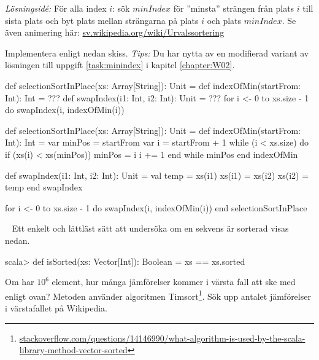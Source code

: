 \emph{Lösningsidé:} För alla index $i$: sök $minIndex$ för ''minsta'' strängen från plats $i$ till sista plats och byt plats mellan strängarna på plats $i$ och plats $minIndex$. Se även animering här: \href{https://sv.wikipedia.org/wiki/Urvalssortering}{sv.wikipedia.org/wiki/Urvalssortering}

Implementera enligt nedan skiss.  \emph{Tips:} Du har nytta av en modifierad variant av lösningen till uppgift \ref{task:minindex} i kapitel \ref{chapter:W02}.
\begin{Code}
def selectionSortInPlace(xs: Array[String]): Unit = 
  def indexOfMin(startFrom: Int): Int = ???
  def swapIndex(i1: Int, i2: Int): Unit = ???
  for i <- 0 to xs.size - 1 do swapIndex(i, indexOfMin(i))
\end{Code}




\SOLUTION


\TaskSolved \what


\begin{Code}
def selectionSortInPlace(xs: Array[String]): Unit = 
  def indexOfMin(startFrom: Int): Int = 
    var minPos = startFrom
    var i = startFrom + 1
    while (i < xs.size) do
      if (xs(i) < xs(minPos)) minPos = i
      i += 1
    end while
    minPos
  end indexOfMin

  def swapIndex(i1: Int, i2: Int): Unit = 
    val temp = xs(i1)
    xs(i1) = xs(i2)
    xs(i2) = temp
  end swapIndex  

  for i <- 0 to xs.size - 1 do swapIndex(i, indexOfMin(i))
end selectionSortInPlace
\end{Code}


\QUESTEND


\clearpage






\QUESTBEGIN

\Task \label{task:isSorted} \what~   Ett enkelt och lättläst sätt att undersöka om en sekvens är sorterad visas nedan.
\begin{REPL}
scala> def isSorted(xs: Vector[Int]): Boolean = xs == xs.sorted
\end{REPL}


\Subtask\Pen  Om  har $10^6$ element, hur många jämförelser kommer i värsta fall att ske med  enligt ovan? Metoden  använder algoritmen Timsort\footnote{\href{http://stackoverflow.com/questions/14146990/what-algorithm-is-used-by-the-scala-library-method-vector-sorted}{stackoverflow.com/questions/14146990/what-algorithm-is-used-by-the-scala-library-method-vector-sorted}}. Sök upp antalet jämförelser i värstafallet på Wikipedia.

